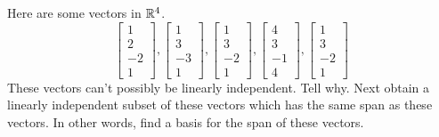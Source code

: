 \documentclass{ximera}
\begin{document}
\begin{problem}\label{prb:3.26} Here are some vectors in $\mathbb{R}^{4}$.
\begin{equation*}
\left[
\begin{array}{r}
1 \\
2 \\
-2 \\
1
\end{array}
\right] ,\left[
\begin{array}{r}
1 \\
3 \\
-3 \\
1
\end{array}
\right] ,\left[
\begin{array}{r}
1 \\
3 \\
-2 \\
1
\end{array}
\right] ,\left[
\begin{array}{r}
4 \\
3 \\
-1 \\
4
\end{array}
\right] ,\left[
\begin{array}{r}
1 \\
3 \\
-2 \\
1
\end{array}
\right]
\end{equation*}
These vectors can't possibly be linearly independent. Tell why. Next obtain a
linearly independent subset of these vectors which has the same span as
these vectors. In other words, find a basis for the span of these vectors.
\end{problem}
\end{document}

